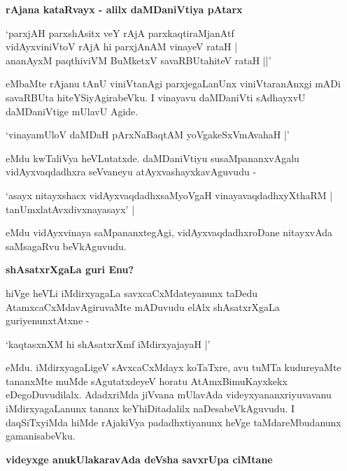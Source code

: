 {\bigskip
\noindent
{\large\bf rAjana kataRvayx - alilx daMDaniVtiya pAtarx}}\label{page92}
\medskip

\begin{shloka}
`parxjAH parxshAsitx veY rAjA parxkaqtiraMjanAtf\\\label{92}
vidAyxviniVtoV rAjA hi parxjAnAM vinayeV rataH |\\

ananAyxM paqthiviVM BuMketxV savaRBUtahiteV rataH ||'
\end{shloka}

\noindent
eMbaMte rAjanu tAnU viniVtanAgi parxjegaLanUnx viniVtaranAnxgi mADi savaRBUta hiteYSiyAgira\-beVku. I vinayavu daMDaniVti sAdhayxvU daMDaniVtige mUlavU Agide.

\begin{shloka}
`vinayamUloV daMDaH pArxNaBaqtAM yoVgakeSxVmAvahaH |'\label{93}
\end{shloka}

\noindent
eMdu kwTaliVya heVLutatxde. daMDaniVtiyu susaMpananxvAgalu vidAyxvaqdadhxra seVvaneyu atAyx\-vashayxka\-vAguvudu -

\begin{shloka}
`asayx nitayxshacx vidAyxvaqdadhxsaMyoVgaH vinayavaqdadhxyXthaRM |\\\label{93}
tanUmxlatAvxdivxnayasayx' |
\end{shloka}

\noindent
eMdu vidAyxvinaya saMpananxtegAgi, vidAyxvaqdadhxroDane nitayxvAda saMsagaRvu beVkAguvudu.

{\bigskip
\noindent
{\large\bf shAsatxrXgaLa guri Enu?}}\label{page93}
\medskip

\noindent
hiVge heVLi iMdirxyagaLa savxcaCxMdateyanunx taDedu AtamxcaCxMdavAgiruvaMte mADuvudu elAlx shAsatxrX\-gaLa guriyenunxtAtxne -

\begin{shloka}
`kaqtasxnXM hi shAsatxrXmf iMdirxyajayaH |'\label{96}
\end{shloka}

\noindent
eMdu. iMdirxyagaLigeV sAvxcaCxMdayx koTaTxre, avu tuMTa kudureyaMte tananxMte muMde sAgutatx\-deyeV horatu AtAmxBimuKayxkekx eDegoDuvudilalx. AdadxriMda jiVvana mUlavAda videyxyananxriyu\-vavanu iMdirxyagaLanunx tananx keYhiDitadalilx naDesabeVkAguvudu. I daqSiTxyiMda hiMde rAjakiVya padadhxti\-yanunx heVge taMdareMbudanunx gamanisabeVku.

{\bigskip
\noindent
{\large\bf videyxge anukUlakaravAda deVsha savxrUpa ciMtane}}
\medskip

